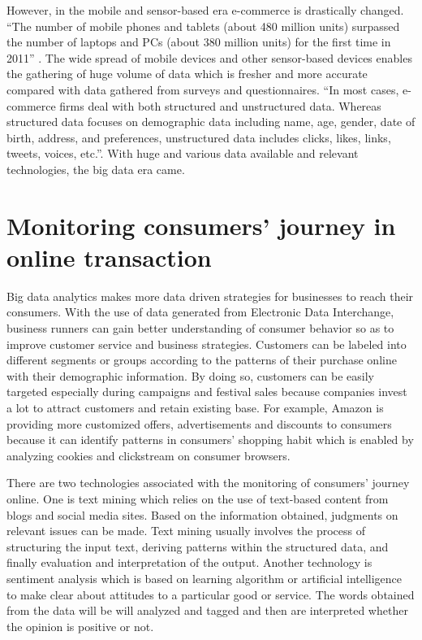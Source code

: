 \documentclass[sigconf]{acmart}
\begin{document}
However, in the mobile and sensor-based era e-commerce is drastically changed. ``The number of mobile phones and tablets (about 480 million units) surpassed the number of laptops and PCs (about 380 million units) for the first time in 2011'' \cite{Chen2012}. The wide spread of mobile devices and other sensor-based devices enables the gathering of huge volume of data which is fresher and more accurate compared with data gathered from surveys and questionnaires. ``In most cases, e-commerce firms deal with both structured and unstructured data. Whereas structured data focuses on demographic data including name, age, gender, date of birth, address, and preferences, unstructured data includes clicks, likes, links, tweets, voices, etc.''\cite{Akter2016}. With huge and various data available and relevant technologies, the big data era came.

\section{Monitoring consumers' journey in online transaction}
Big data analytics makes more data driven strategies for businesses to reach their consumers. With the use of data generated from Electronic Data Interchange, business runners can gain better understanding of consumer behavior so as to improve customer service and business strategies. Customers can be labeled into different segments or groups according to the patterns of their purchase online with their demographic information. By doing so, customers can be easily targeted especially during campaigns and festival sales because companies invest a lot to attract customers and retain existing base\cite{Patranabish2016}. For example, Amazon is providing more customized offers, advertisements and discounts to consumers because it can identify patterns in consumers' shopping habit which is enabled by analyzing cookies and clickstream on consumer browsers\cite{Edosio2014}.

There are two technologies associated with the monitoring of consumers' journey online. One is text mining which relies on the use of text-based content from blogs and social media sites. Based on the information obtained, judgments on relevant issues can be made\cite{Edosio2014}. Text mining usually involves the process of structuring the input text, deriving patterns within the structured data, and finally evaluation and interpretation of the output\cite{Wikipedia2017a}. Another technology is sentiment analysis which is based on learning algorithm or artificial intelligence to make clear about attitudes to a particular good or service. The words obtained from the data will be will analyzed and tagged and then are interpreted whether the opinion is positive or not\cite{Edosio2014}.
\end{document}
